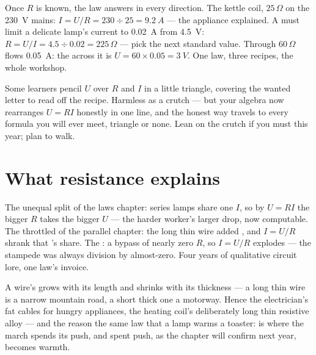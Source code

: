 \begin{example}\label{ex:g8:ohms-law:compute}
Once $R$ is known, the law answers in every direction.
The kettle coil, $25\,\Omega$ on the \qty{230}{V} mains:
$I = U/R = 230 \div 25 = \qty{9.2}{A}$ --- the 
appliance explained. A  must limit a delicate lamp's
current to \qty{0.02}{A} from \qty{4.5}{V}: $R = U/I = 4.5
\div 0.02 = 225\,\Omega$ --- pick the next standard value.
Through $60\,\Omega$ flows \qty{0.05}{A}: the  across
it is $U = 60 \times 0.05 = \qty{3}{V}$. One law, three
recipes, the whole workshop.
\end{example}

\begin{remark}\label{rem:g8:ohms-law:triangle}
Some learners pencil $U$ over $R$ and $I$ in a little
triangle, covering the wanted letter to read off the recipe.
Harmless as a crutch --- but your algebra now rearranges
$U = R I$ honestly in one line, and the honest way travels to
every formula you will ever meet, triangle or none. Lean on
the crutch if you must this year; plan to walk.
\end{remark}

\section{What resistance explains}

\begin{example}\label{ex:g8:ohms-law:mysteries}
The unequal  split of the laws chapter: series lamps
share one $I$, so by $U = R I$ the bigger $R$ takes the bigger
$U$ --- the harder worker's larger drop, now computable. The
throttled  of the parallel chapter: the long thin wire
added , and $I = U/R$ shrank that 's share.
The : a bypass of nearly zero $R$, so $I = U/R$
explodes --- the stampede was always division by almost-zero.
Four years of qualitative circuit lore, one law's invoice.
\end{example}

\begin{example}\label{ex:g8:ohms-law:wires}
A wire's  grows with its length and shrinks with its
thickness --- a long thin wire is a narrow mountain road, a
short thick one a motorway. Hence the electrician's fat cables
for hungry appliances, the heating coil's deliberately long
thin resistive alloy --- and the reason the same law that 
a lamp warms a toaster:  is where the march spends
its push, and spent push, as the  chapter will confirm
next year, becomes warmth.
\end{example}

